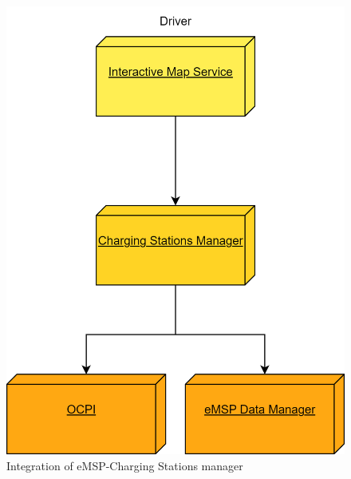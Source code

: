 \documentclass[table, 12pt]{article}
\begin{document}
\begin{figure}[H]
    \centering
    \includegraphics[scale=0.6]{assets/Integration Diagrams/eMSP-Charging stations manager.png} 
    \caption{Integration of eMSP-Charging Stations manager}%
    \label{fig: eMSP-Charging Stations manager}%
\end{figure}
\end{document}
